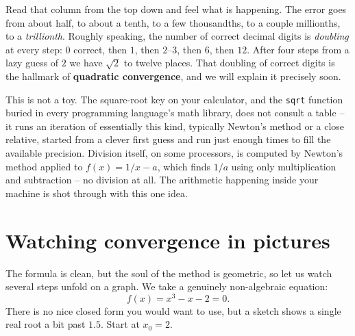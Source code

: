 Read that column from the top down and feel what is happening. The error goes from
about half, to about a tenth, to a few thousandths, to a couple millionths, to a
\emph{trillionth}. Roughly speaking, the number of correct decimal digits is
\emph{doubling} at every step: $0$ correct, then $1$, then $2$--$3$, then $6$, then
$12$. After four steps from a lazy guess of $2$ we have $\sqrt2$ to twelve places.
That doubling of correct digits is the hallmark of \textbf{quadratic convergence},
and we will explain it precisely soon.

\begin{applicationbox}
This is not a toy. The square-root key on your calculator, and the
\texttt{sqrt} function buried in every programming language's math library, does
not consult a table -- it runs an iteration of essentially this kind, typically
Newton's method or a close relative, started from a clever first guess and run just
enough times to fill the available precision. Division itself, on some processors,
is computed by Newton's method applied to $f(x) = 1/x - a$, which finds $1/a$ using
only multiplication and subtraction -- no division at all. The arithmetic happening
inside your machine is shot through with this one idea.
\end{applicationbox}

\section{Watching convergence in pictures}
\label{ch19:pictures}

The formula is clean, but the soul of the method is geometric, so let us watch
several steps unfold on a graph. We take a genuinely non-algebraic equation:
\[
  f(x) = x^3 - x - 2 = 0.
\]
There is no nice closed form you would want to use, but a sketch shows a single
real root a bit past $1.5$. Start at $x_0 = 2$.

